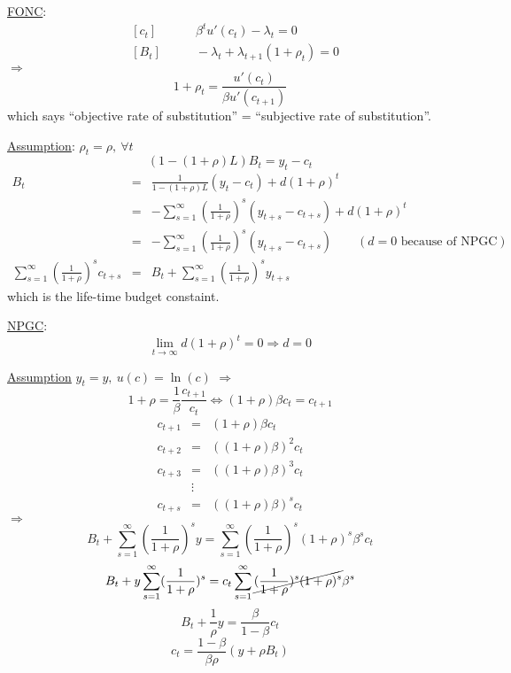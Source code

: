 \documentclass[twoside]{article}
\newcommand\imp{$\Longrightarrow$}
\begin{document}
\underline{FONC}:
\begin{eqnarray}
    &[c_{t}]& \qquad \beta^{t} u'(c_{t}) - \lambda_{t} = 0\\
    &[B_t]& \qquad -\lambda_{t} + \lambda_{t+1}(1+\rho_{t}) = 0
\end{eqnarray}
\imp
\begin{equation}
    1 + \rho_{t} = \frac{u'(c_{t})}{\beta u'(c_{t+1})}
\end{equation}
which says ``objective rate of substitution'' = ``subjective rate of substitution''.

\underline{Assumption}: $\rho_{t} = \rho, ~ \forall t$ 
\begin{equation}
    (1 - (1+ \rho)L)B_{t} = y_{t} - c_{t}
\end{equation}
\begin{eqnarray}
    B_{t} 
    &=& \frac{1}{1 - (1+ \rho)L}(y_{t} - c_{t}) + d (1 + \rho)^{t} \\
    &=& - \sum_{s=1}^{\infty} (\frac{1}{1+\rho})^{s}(y_{t+s}-c_{t+s}) + d (1 + \rho)^{t}\\
    &=& - \sum_{s=1}^{\infty} (\frac{1}{1+\rho})^{s}(y_{t+s}-c_{t+s}) \qquad (d = 0 \text{ because of NPGC})\\
    \sum_{s=1}^{\infty} (\frac{1}{1+\rho})^{s} c_{t+s} &=& B_{t} + \sum_{s=1}^{\infty} (\frac{1}{1+\rho})^{s} y_{t+s} 
\end{eqnarray}
which is the life-time budget constaint.

\underline{NPGC}:
\begin{equation}
    \lim_{t \to \infty} d(1+\rho)^{t} = 0 \Longrightarrow d = 0
\end{equation}

\underline{Assumption} $y_{t} = y, ~u(c) = \ln(c)$ \imp
\begin{equation}
    1 + \rho = \frac{1}{\beta }\frac{c_{t+1}}{c_{t} } \iff (1 + \rho)\beta c_{t} = c_{t+1}
\end{equation}
\begin{eqnarray}
    c_{t+1} &=& (1 + \rho)\beta c_{t}\\
    c_{t+2} &=& ((1 + \rho)\beta)^2 c_{t}\\
    c_{t+3} &=& ((1 + \rho)\beta)^3 c_{t}\\
    &\vdots&\\
    c_{t+s} &=& ((1 + \rho)\beta)^s c_{t}
\end{eqnarray}
\imp
\begin{equation}
    B_{t} + \sum_{s=1}^{\infty} (\frac{1}{1+\rho})^{s}y = 
     \sum_{s=1}^{\infty} (\frac{1}{1+\rho})^{s} (1 + \rho)^{s}\beta^{s} c_{t}
\end{equation}
\begin{equation}
    B_{t} + y \sum_{s=1}^{\infty} (\frac{1}{1+\rho})^{s} = 
     c_{t} \sum_{s=1}^{\infty} \cancel{(\frac{1}{1+\rho})^{s} (1 + \rho)^{s}}\beta^{s} 
\end{equation}
\begin{equation}
    B_{t} + \frac{1}{\rho}y = \frac{\beta}{1-\beta} c_{t}
\end{equation}
\begin{equation}
    c_t = \frac{1- \beta}{\beta \rho}(y + \rho B_{t})
\end{equation}
\end{document}
